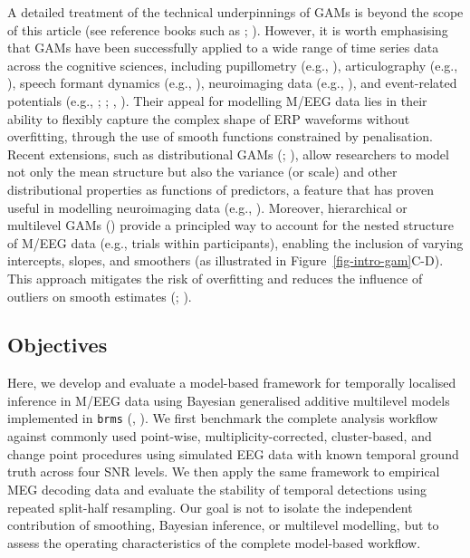\documentclass[
  doc,
  floatsintext,
  longtable,
  a4paper,
  nolmodern,
  notxfonts,
  notimes,
  colorlinks=true,linkcolor=blue,citecolor=blue,urlcolor=blue]{apa7}
\begin{document}
A detailed treatment of the technical underpinnings of GAMs is beyond
the scope of this article (see reference books such as
;
). However, it is worth emphasising
that GAMs have been successfully applied to a wide range of time series
data across the cognitive sciences, including pupillometry (e.g.,
), articulography (e.g.,
), speech formant dynamics
(e.g., ), neuroimaging
data (e.g., ), and
event-related potentials (e.g., ; ;
,
). Their appeal for modelling M/EEG data
lies in their ability to flexibly capture the complex shape of ERP
waveforms without overfitting, through the use of smooth functions
constrained by penalisation. Recent extensions, such as distributional
GAMs (;
), allow researchers to
model not only the mean structure but also the variance (or scale) and
other distributional properties as functions of predictors, a feature
that has proven useful in modelling neuroimaging data (e.g.,
). Moreover, hierarchical or
multilevel GAMs () provide a principled way to account for the
nested structure of M/EEG data (e.g., trials within participants),
enabling the inclusion of varying intercepts, slopes, and smoothers (as
illustrated in Figure~\ref{fig-intro-gam}\ignorespaces C-D). This
approach mitigates the risk of overfitting and reduces the influence of
outliers on smooth estimates (; ).

\subsection{Objectives}\label{objectives}

Here, we develop and evaluate a model-based framework for temporally
localised inference in M/EEG data using Bayesian generalised additive
multilevel models implemented in \texttt{brms}
(, ).
We first benchmark the complete analysis workflow against commonly used
point-wise, multiplicity-corrected, cluster-based, and change point
procedures using simulated EEG data with known temporal ground truth
across four SNR levels. We then apply the same framework to empirical
MEG decoding data and evaluate the stability of temporal detections
using repeated split-half resampling. Our goal is not to isolate the
independent contribution of smoothing, Bayesian inference, or multilevel
modelling, but to assess the operating characteristics of the complete
model-based workflow.
\end{document}
